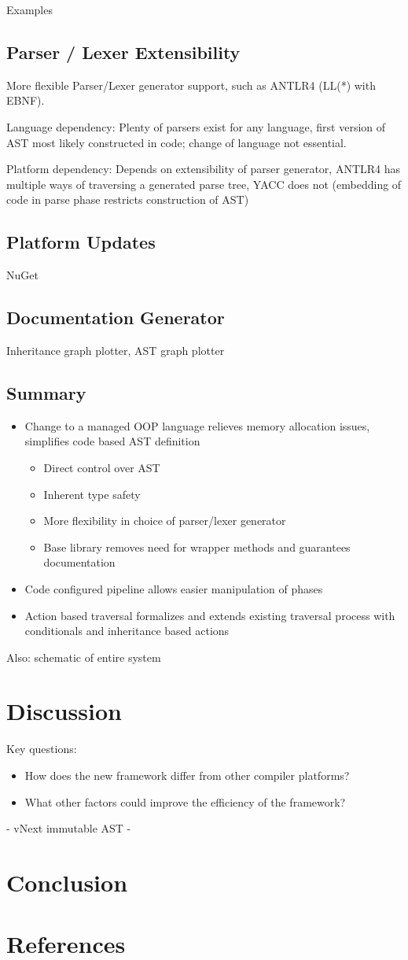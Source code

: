 \documentclass[final,a4paper,12pt]{article}
\begin{document}
Examples
\subsection{Parser / Lexer Extensibility}
More flexible Parser/Lexer generator support, such as ANTLR4 (LL(*) with EBNF).

Language dependency: Plenty of parsers exist for any language, first version of AST most likely constructed in code; change of language not essential.

Platform dependency: Depends on extensibility of parser generator, ANTLR4 has multiple ways of traversing a generated parse tree, YACC does not (embedding of code in parse phase restricts construction of AST)
\subsection{Platform Updates}
NuGet
\subsection{Documentation Generator}
Inheritance graph plotter, AST graph plotter
\subsection{Summary}
\begin{itemize}
	\item Change to a managed OOP language relieves memory allocation issues, simplifies code based AST definition
	\begin{itemize}
		\item Direct control over AST
		\item Inherent type safety
		\item More flexibility in choice of parser/lexer generator
		\item Base library removes need for wrapper methods and guarantees documentation
	\end{itemize}
	\item Code configured pipeline allows easier manipulation of phases
	\item Action based traversal formalizes and extends existing traversal process with conditionals and inheritance based actions
\end{itemize}
Also: schematic of entire system
\section{Discussion}
Key questions:
\begin{itemize}
	\item How does the new framework differ from other compiler platforms?
	\item What other factors could improve the efficiency of the framework?
\end{itemize}

- vNext immutable AST
- 

\section{Conclusion}



\section{References}


\end{document}
